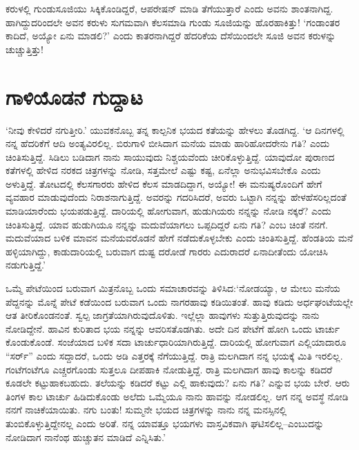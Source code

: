 ಕರುಳಲ್ಲಿ ಗುಂಡುಸೂಜಿಯು ಸಿಕ್ಕಿಕೊಂಡಿದ್ದರೆ, ಆಪರೇಷನ್ ಮಾಡಿ ತೆಗೆಯುತ್ತಾರೆ ಎಂದು ಅವನು ಶಾಂತನಾಗಿದ್ದ. ಹಾಗಿದ್ದುದರಿಂದಲೇ ಅವನ ಕರುಳು ಸುಗಮವಾಗಿ ಕೆಲಸಮಾಡಿ ಗುಂಡು ಸೂಜಿಯನ್ನು ಹೊರಹಾಕಿತ್ತು! ‘ಗಂಡಾಂತರ ಕಾದಿದೆ, ಅಯ್ಯೋ ಏನು ಮಾಡಲಿ?’ ಎಂದು ಕಾತರನಾಗಿದ್ದರೆ ಹೆದರಿಕೆಯ ದೆಸೆಯಿಂದಲೇ ಸೂಜಿ ಅವನ ಕರುಳನ್ನು ಚುಚ್ಚುತ್ತಿತ್ತು!


\section*{ಗಾಳಿಯೊಡನೆ ಗುದ್ದಾಟ}


‘ನೀವು ಕೇಳಿದರೆ ನಗುತ್ತೀರಿ.’ ಯುವಕನೊಬ್ಬ ತನ್ನ ಕಾಲ್ಪನಿಕ ಭಯದ ಕತೆಯನ್ನು ಹೇಳಲು ತೊಡಗಿದ್ದ. ‘ಆ ದಿನಗಳಲ್ಲಿ ನನ್ನ ಹೆದರಿಕೆಗೆ ಆದಿ ಅಂತ್ಯವಿರಲಿಲ್ಲ. ಬಿರುಗಾಳಿ ಬೀಸಿದಾಗ ಮನೆಯ ಮಾಡು ಹಾರಿಹೋದರೇನು ಗತಿ? ಎಂದು ಚಿಂತಿಸುತ್ತಿದ್ದೆ. ಸಿಡಿಲು ಬಡಿದಾಗ ನಾನು ಸಾಯುವುದು ನಿಶ್ಚಯವೆಂದು ಚೀರಿಕೊಳ್ಳುತ್ತಿದ್ದೆ. ಯಾವುದೋ ಪುರಾಣದ ಕತೆಗಳಲ್ಲಿ ಹೇಳಿದ ನರಕದ ಚಿತ್ರಗಳನ್ನು ನೋಡಿ, ಸತ್ತಮೇಲೆ ಎಷ್ಟು ಕಷ್ಟ, ಏನೆಲ್ಲಾ ಅನುಭವಿಸಬೇಕೊ ಎಂದು ಅಳುತ್ತಿದ್ದೆ. ತೋಟದಲ್ಲಿ ಕೆಲಸಗಾರರು ಹೇಳಿದ ಕೆಲಸ ಮಾಡದಿದ್ದಾಗ, ಅಯ್ಯೋ! ಈ ಮನುಷ್ಯರೊಂದಿಗೆ ಹೇಗೆ ವ್ಯವಹಾರ ಮಾಡುವುದೆಂದು ನಿರಾಶನಾಗುತ್ತಿದ್ದೆ. ಅವರನ್ನು ಗದರಿಸಿದರೆ, ಅವರು ಒಟ್ಟಾಗಿ ನನ್ನನ್ನು ಹೇಳಹೆಸರಿಲ್ಲದಂತೆ ಮಾಡಿಯಾರೆಂದು ಭಯಪಡುತ್ತಿದ್ದೆ. ದಾರಿಯಲ್ಲಿ ಹೋಗುವಾಗ, ಹುಡುಗಿಯರು ನನ್ನನ್ನು ನೋಡಿ ನಕ್ಕರೆ? ಎಂದು ಚಿಂತಿಸುತ್ತಿದ್ದೆ. ಯಾವ ಹುಡುಗಿಯೂ ನನ್ನನ್ನು ಮದುವೆಯಾಗಲು ಒಪ್ಪದಿದ್ದರೆ ಏನು ಗತಿ? ಎಂಬ ಚಿಂತೆ ನನಗೆ. ಮದುವೆಯಾದ ಬಳಿಕ ಮಾವನ ಮನೆಯವರೊಡನೆ ಹೇಗೆ ನಡೆದುಕೊಳ್ಳಬೇಕು ಎಂದು ಚಿಂತಿಸುತ್ತಿದ್ದೆ. ಹೆಂಡತಿಯ ಮನೆ ಹಳ್ಳಿಯಾಗಿದ್ದು, ಕಾಡುದಾರಿಯಲ್ಲಿ ಬರುವಾಗ ದುಷ್ಟ ದರೋಡೆ ಗಾರರು ಎದುರಾದರೆ ಏನಾದೀತೆಂದು ಯೋಚಿಸಿ ನಡುಗುತ್ತಿದ್ದೆ.’

ಒಮ್ಮೆ ಪೇಟೆಯಿಂದ ಬರುವಾಗ ಮಿತ್ರನೊಬ್ಬ ಒಂದು ಸಮಾಚಾರವನ್ನು ತಿಳಿಸಿದ:\break ‘ನೋಡಯ್ಯಾ, ಆ ಮೇಲು ಮನೆಯ ಪೆದ್ದನನ್ನು ಮೊನ್ನೆ ಪೇಟೆ ಕಡೆಯಿಂದ ಬರುವಾಗ ಒಂದು ನಾಗರಹಾವು ಕಡಿಯಿತಂತೆ. ಹಾವು ಕಡಿದು ಅರ್ಧಘಂಟೆಯಲ್ಲೇ ಆತ ತೀರಿಕೊಂಡನಂತೆ. ಸ್ವಲ್ಪ ಜಾಗ್ರತೆಯಾಗಿರುವುದೊಳಿತು. ಇಲ್ಲೆಲ್ಲಾ ಹಾವುಗಳು ಸುತ್ತುತ್ತಿರುವುದನ್ನು ನಾನು ನೋಡಿದ್ದೇನೆ. ಹಾವಿನ ಕುರಿತಾದ ಭಯ ನನ್ನನ್ನು ಆವರಿಸತೊಡಗಿತು. ಅದೇ ದಿನ ಪೇಟೆಗೆ ಹೋಗಿ ಒಂದು ಟಾರ್ಚು ಕೊಂಡುಕೊಂಡೆ. ಸಂಜೆಯಾದ ಬಳಿಕ ಸದಾ ಟಾರ್ಚುಧಾರಿಯಾಗಿರುತ್ತಿದ್ದೆ. ದಾರಿಯಲ್ಲಿ ಹೋಗುವಾಗ ಎಲ್ಲಿಯಾದಾರೂ “ಸರ್ರ್​” ಎಂದು ಸದ್ದಾದರೆ, ಒಂದು ಅಡಿ ಎತ್ತರಕ್ಕೆ ನೆಗೆಯುತ್ತಿದ್ದೆ. ರಾತ್ರಿ ಮಲಗಿದಾಗ ನನ್ನ ಭಯಕ್ಕೆ ಮಿತಿ ಇರಲಿಲ್ಲ. ಗಂಟೆಗಂಟೆಗೂ ಎಚ್ಚರಗೊಂಡು ಸುತ್ತಲೂ ದೀಪಹಾಕಿ ನೋಡುತ್ತಿದ್ದೆ. ರಾತ್ರಿ ಮಲಗಿದಾಗ ಹಾವು ಕಾಲನ್ನು ಕಡಿದರೆ ಕೂಡಲೇ ಕಟ್ಟುಹಾಕಬಹುದು. ತಲೆಯನ್ನು ಕಡಿದರೆ ಕಟ್ಟು ಎಲ್ಲಿ ಹಾಕುವುದು? ಏನು ಗತಿ? ಎನ್ನುವ ಭಯ ಬೇರೆ. ಆರು ತಿಂಗಳ ಕಾಲ ಟಾರ್ಚು ಹಿಡಿದುಕೊಂಡು ಅಲೆದು ಒಮ್ಮೆಯೂ ನಾನು ಹಾವನ್ನು ನೋಡಲಿಲ್ಲ. ಆಗ ನನ್ನ ಅವಸ್ಥೆ ನೋಡಿ ನನಗೆ ನಾಚಿಕೆಯಾಯಿತು. ನಗು ಬಂತು! ಸುಮ್ಮನೇ ಭಯದ ಚಿತ್ರಗಳನ್ನು ನಾನು ನನ್ನ ಮನಸ್ಸಿನಲ್ಲಿ ತುಂಬಿಕೊಳ್ಳುತ್ತಿದ್ದೇನಲ್ಲ ಎಂದು ಅರಿತೆ. ನನ್ನ ಯಾವತ್ತೂ ಭಯಗಳು ವಾಸ್ತವಿಕವಾಗಿ ಘಟಿಸಲಿಲ್ಲ–ಎಂಬುದನ್ನು ನೋಡಿದಾಗ ನಾನೆಂಥ ಹುಚ್ಚುತನ ಮಾಡಿದೆ ಎನ್ನಿಸಿತು.’

\newpage

